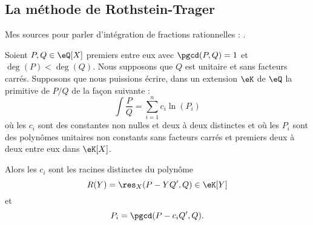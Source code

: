 
\subsection{La méthode de Rothstein-Trager}
\label{subSecBCRYooRVjFpS}

Mes sources pour parler d'intégration de fractions rationnelles : \cite{CPheFRq}.

\begin{theorem} \label{ThoXJFatfu}
    Soient \( P,Q\in \eQ[X]\) premiers entre eux avec \( \pgcd(P,Q)=1\) et \( \deg(P)<\deg(Q)\). Nous supposons que \( Q\) est unitaire et sans facteurs carrés. Supposons que nous puissions écrire, dans un extension \( \eK\) de \( \eQ\) la primitive de \( P/Q\) de la façon suivante :
    \begin{equation}        \label{EqCHVaDay}
        \int\frac{ P }{ Q }=\sum_{i=1}^n c_i\ln(P_i)
    \end{equation}
    où les \( c_i\) sont des constantes non nulles et deux à deux distinctes et où les \( P_i\) sont des polynômes unitaires non constants sans facteurs carrés et premiers deux à deux entre eux dans \( \eK[X]\).

    Alors les \( c_i\) sont les racines distinctes du polynôme
    \begin{equation}
        R(Y)=\res_X(P-YQ',Q)\in \eK[Y]
    \end{equation}
    et
    \begin{equation}
        P_i=\pgcd(P-c_iQ',Q).
    \end{equation}
\end{theorem}


